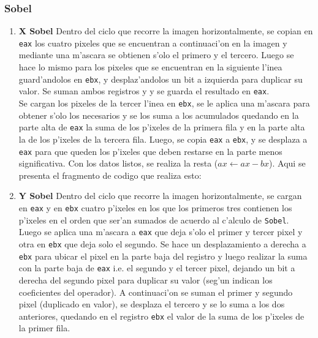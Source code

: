 \documentclass[11pt]{article}
\begin{document}
\subsubsection{Sobel}
\begin{enumerate}
Presentaremos la el c'odigo de la funci'on completa de sobel para ver el funcionamiento en totalidad y en el resto de los operadores se har'a mencion solo al fragmento de codigo que realiza las operaciones importantes:
\item \textbf{X Sobel}
\subitem Dentro del ciclo que recorre la imagen horizontalmente, se copian en \verb'eax' los cuatro pixeles que se encuentran a continuaci'on en la imagen y mediante una m'ascara se obtienen s'olo el primero y el tercero. Luego se hace lo mismo para los pixeles que se encuentran en la siguiente l'inea guard'andolos en \verb'ebx', y desplaz'andolos un bit a izquierda para duplicar su valor. Se suman ambos registros y y se guarda el resultado en \verb'eax'.\\
Se cargan los pixeles de la tercer l'inea en \verb'ebx', se le aplica una m'ascara para obtener s'olo los necesarios y se los suma a los acumulados quedando en la parte alta de \verb'eax' la suma de los p'ixeles de la primera fila y en la parte alta la de los p'ixeles de la tercera fila. Luego, se copia  \verb'eax' a \verb'ebx', y se desplaza a \verb'eax' para que queden los p'ixeles que deben restarse en la parte menos significativa. 
Con los datos listos, se realiza la resta ($ax \leftarrow ax - bx$). Aqui se presenta el fragmento de codigo que realiza esto:
\item \textbf{Y Sobel}
\subitem Dentro del ciclo que recorre la imagen horizontalmente, se cargan en \verb'eax' y en \verb'ebx' cuatro p'ixeles en los que los primeros tres contienen los p'ixeles en el orden que ser'an sumados de acuerdo al c'alculo de \verb'Sobel'.\\
Luego se aplica una m'ascara a \verb'eax' que deja s'olo el primer y tercer pixel y otra en \verb'ebx' que deja solo el segundo. Se hace un desplazamiento a derecha a \verb'ebx' para ubicar el pixel en la parte baja del registro y luego realizar la suma con la parte baja de \verb'eax' i.e. el segundo y el tercer pixel, dejando un bit a derecha del segundo pixel para duplicar su valor (seg'un indican los coeficientes del operador). A continuaci'on se suman el primer y segundo pixel (duplicado en valor), se desplaza el tercero y se lo suma a los dos anteriores, quedando en el registro \verb'ebx' el valor de la suma de los p'ixeles de la primer fila.\\

\end{enumerate}
\end{document}
